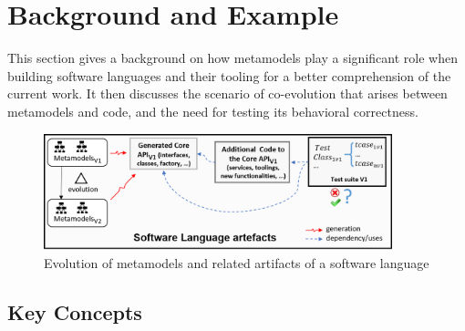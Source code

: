 

\section{Background and Example}
\label{sec_background}




This section gives a background on how metamodels play a significant role when building software languages and their tooling for a better comprehension of the current work. It then discusses the scenario of co-evolution that arises between metamodels and code, and the need for testing its behavioral correctness. 

\begin{figure}[tb]
	\centering
	\includegraphics[width=0.9\textwidth]{./pics/chapter2pics/background.png}
	\caption{Evolution of metamodels and related artifacts of a software language}
	\label{fig:SL_useage}
\end{figure}


\subsection{Key Concepts}


